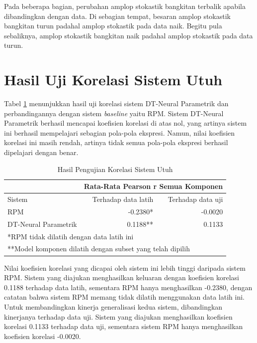 Pada beberapa bagian, perubahan amplop stokastik bangkitan terbalik apabila dibandingkan dengan data. Di sebagian tempat, besaran amplop stokastik bangkitan turun padahal amplop stokastik pada data naik. Begitu pula sebaliknya, amplop stokastik bangkitan naik padahal amplop stokastik pada data turun. %


\section{Hasil Uji Korelasi Sistem Utuh}
Tabel \ref{tab-system-testing-results} menunjukkan hasil uji korelasi sistem DT-Neural Parametrik dan perbandingannya dengan sistem \textit{baseline} yaitu RPM. Sistem DT-Neural Parametrik berhasil mencapai koefisien korelasi di atas nol, yang artinya sistem ini berhasil mempelajari sebagian pola-pola ekspresi. Namun, nilai koefisien korelasi ini masih rendah, artinya tidak semua pola-pola ekspresi berhasil dipelajari dengan benar.

\begin{table}[htbp]
    \centering
    \caption{Hasil Pengujian Korelasi Sistem Utuh}\label{tab-system-testing-results}
    \begin{tabular}{ |l|r|r| } 
     \cline{2-3}
     \multicolumn{1}{l|}{}&\multicolumn{2}{|l|}{Rata-Rata Pearson r Semua Komponen}\\\hline
     Sistem&Terhadap data latih&Terhadap data uji\\\hline
	 RPM&-0.2380* &-0.0020\\\hline
	 DT-Neural Parametrik& 0.1188**&0.1133\\\hline
	 \multicolumn{3}{l}{*RPM tidak dilatih dengan data latih ini}\\
	 \multicolumn{3}{l}{**Model komponen dilatih dengan subset yang telah dipilih}\\
    \end{tabular}
\end{table}

Nilai koefisien korelasi yang dicapai oleh sistem ini lebih tinggi daripada sistem RPM. Sistem yang diajukan menghasilkan keluaran dengan koefisien korelasi 0.1188 terhadap data latih, sementara RPM hanya menghasilkan -0.2380, dengan catatan bahwa sistem RPM memang tidak dilatih menggunakan data latih ini. Untuk membandingkan kinerja generalisasi kedua sistem, dibandingkan kinerjanya terhadap data uji. Sistem yang diajukan menghasilkan koefisien korelasi 0.1133 terhadap data uji, sementara sistem RPM hanya menghasilkan koefisien  korelasi -0.0020.



